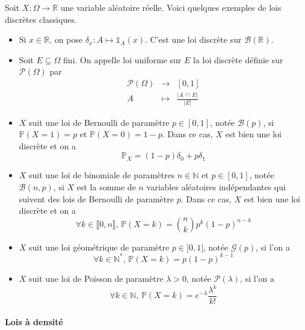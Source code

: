 
  \begin{example}
    \label{261-1}
    Soit $X : \Omega \rightarrow \mathbb{R}$ une variable aléatoire réelle. Voici quelques exemples de lois discrètes classiques.
    \begin{itemize}
      \item \label{261-2} Si $x \in \mathbb{R}$, on pose $\delta_x : A \mapsto \mathbb{1}_A(x)$. C'est une loi discrète sur $\mathcal{B}(\mathbb{R})$.
      \item Soit $E \subseteq \Omega$ fini. On appelle loi uniforme sur $E$ la loi discrète définie sur $\mathcal{P}(\Omega)$ par
      \[
      \begin{array}{ccc}
        \mathcal{P}(\Omega) &\rightarrow& [0,1] \\
        A &\mapsto& \frac{\vert A \, \cap \, E \vert}{\vert E \vert}
      \end{array}
      \]
      \item $X$ suit une loi de Bernoulli de paramètre $p \in [0,1]$, notée $\mathcal{B}(p)$, si $\mathbb{P}(X=1) = p$ et $\mathbb{P}(X=0)=1-p$. Dans ce cas, $X$ est bien une loi discrète et on a
      \[ \mathbb{P}_X = (1-p) \delta_0 + p \delta_1 \]
      \item $X$ suit une loi de binomiale de paramètres $n \in \mathbb{N}$ et $p \in [0,1]$, notée $\mathcal{B}(n, p)$, si $X$ est la somme de $n$ variables aléatoires indépendantes qui suivent des lois de Bernoulli de paramètre $p$. Dans ce cas, $X$ est bien une loi discrète et on a
      \[ \forall k \in \llbracket 0,n \rrbracket, \, \mathbb{P}(X = k) = \binom{n}{k} p^k (1-p)^{n-k} \]
      \item $X$ suit une loi géométrique de paramètre $p \in ]0,1]$, notée $\mathcal{G}(p)$, si l'on a
      \[ \forall k \in \mathbb{N}^{*}, \, \mathbb{P}(X = k) = p(1-p)^{k-1} \]
      \item $X$ suit une loi de Poisson de paramètre $\lambda > 0$, notée $\mathcal{P}(\lambda)$, si l'on a
      \[ \forall k \in \mathbb{N}, \, \mathbb{P}(X = k) = e^{-\lambda} \frac{\lambda^k}{k!} \]
    \end{itemize}
  \end{example}

  \paragraph{Lois à densité}


